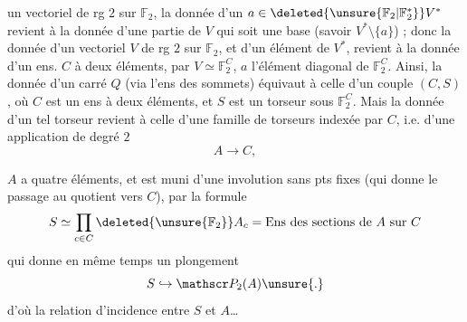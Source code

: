 
un vectoriel  de rg $2$ sur $\mathbb F_2$, la donnée d'un $a\in\deleted{\unsure{\mathbb F_2|\mathbb F_2^*}}V^*$ revient à la donnée d'une partie de $V$ qui soit une base (savoir $V^*\setminus\{a\}$) ; donc la donnée d'un  vectoriel $V$ de rg $2$ sur $\mathbb F_2$, et d'un élément  de $V^*$, revient à la donnée d'un ens. $C$ à deux éléments, par $V\simeq\mathbb F_2^C$, $a$ l'élément diagonal de $\mathbb F_2^C$. Ainsi, la donnée d'un carré $Q$  (via l'ens des sommets) équivaut à celle d'un couple $(C,S)$, où $C$  est un ens à deux éléments, et $S$ est un torseur sous $\mathbb F_2^C$. Mais la donnée d'un tel torseur revient à celle d'une famille de torseurs indexée par $C$, i.e. d'une application de degré $2$
\[
A\longrightarrow C,
\]

$A$ a quatre éléments, et est muni d'une involution sans pts fixes (qui donne le passage au quotient vers $C$), par la formule
\[
S\simeq\prod_{c\in C}\deleted{\unsure{\mathbb F_2}} A_c=\text{Ens des sections de } A\text{ sur } C
\]
qui donne en même temps un plongement
\[
S\hookrightarrow\mathscr P_2(A)\unsure{.}
\]
d'où la relation d'incidence entre $S$ et $A$\ldots



